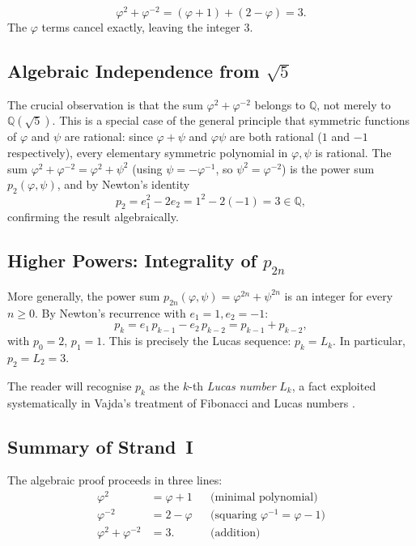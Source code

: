 \[
  \varphi^{2} + \varphi^{-2}
  = (\varphi + 1) + (2 - \varphi)
  = 3.
\]
The $\varphi$ terms cancel exactly, leaving the integer $3$.

\subsection{Algebraic Independence from $\sqrt{5}$}

The crucial observation is that the sum $\varphi^{2}+\varphi^{-2}$
belongs to $\mathbb{Q}$, not merely to $\mathbb{Q}(\sqrt{5})$.
This is a special case of the general principle that symmetric
functions of $\varphi$ and $\psi$ are rational: since $\varphi+\psi$
and $\varphi\psi$ are both rational ($1$ and $-1$ respectively),
every elementary symmetric polynomial in $\varphi,\psi$ is rational.
The sum $\varphi^{2}+\varphi^{-2} = \varphi^{2}+\psi^{2}$
(using $\psi = -\varphi^{-1}$, so $\psi^{2} = \varphi^{-2}$)
is the power sum $p_{2}(\varphi,\psi)$, and by Newton's identity
\[
  p_{2} = e_{1}^{2} - 2e_{2} = 1^{2} - 2(-1) = 3 \in \mathbb{Q},
\]
confirming the result algebraically.

\subsection{Higher Powers: Integrality of $p_{2n}$}

More generally, the power sum $p_{2n}(\varphi,\psi) = \varphi^{2n}+\psi^{2n}$
is an integer for every $n \geq 0$.
By Newton's recurrence with $e_{1}=1, e_{2}=-1$:
\[
  p_{k} = e_{1}\,p_{k-1} - e_{2}\,p_{k-2}
         = p_{k-1} + p_{k-2},
\]
with $p_{0}=2$, $p_{1}=1$.
This is precisely the Lucas sequence: $p_{k} = L_{k}$.
In particular, $p_{2} = L_{2} = 3$.

The reader will recognise $p_{k}$ as the $k$-th \emph{Lucas number}
$L_{k}$, a fact exploited systematically in Vajda's treatment of
Fibonacci and Lucas numbers \cite{vajda_fib_lucas}.

\subsection{Summary of Strand~I}

The algebraic proof proceeds in three lines:
\begin{align*}
  \varphi^{2} &= \varphi + 1            &&\text{(minimal polynomial)}\\
  \varphi^{-2} &= 2 - \varphi           &&\text{(squaring $\varphi^{-1}=\varphi-1$)}\\
  \varphi^{2}+\varphi^{-2} &= 3.        &&\text{(addition)}
\end{align*}

